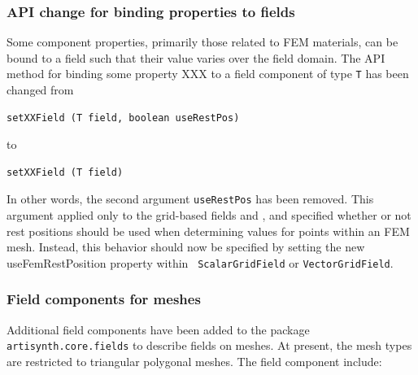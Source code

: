 \documentclass{article}
\begin{document}
\subsubsection{API change for binding properties to fields}

Some component properties, primarily those related to FEM materials,
can be bound to a field such that their value varies over the field
domain. The API method for binding some property XXX to a field 
component of type {\tt T} has been changed from
%
\begin{lstlisting}[]
  setXXField (T field, boolean useRestPos)
\end{lstlisting}
%
to
%
\begin{lstlisting}[]
  setXXField (T field)
\end{lstlisting}
%
In other words, the second argument {\tt useRestPos} has been
removed. This argument applied only to the grid-based fields
 and
, and specified
whether or not rest positions should be used when determining values
for points within an FEM mesh. Instead, this behavior should now be
specified by setting the new {\sf useFemRestPosition} property within {\tt
ScalarGridField} or {\tt VectorGridField}.

\subsubsection{Field components for meshes}

Additional field components have been added to the package {\tt
artisynth.core.fields} to describe fields on meshes. At present, the
mesh types are restricted to triangular polygonal meshes. The field
component include:
\end{document}

